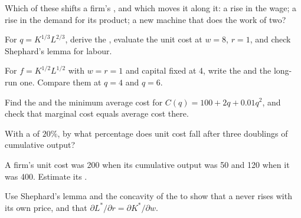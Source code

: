 \begin{exercise}[$\star$]\label{exo:b1:cost-minimisation:shift}
Which of these shifts a firm's , and which moves it along it:
a rise in the wage; a rise in the demand for its product; a new machine
that does the work of two?
\end{exercise}

\begin{exercise}[$\star\star$]\label{exo:b1:cost-minimisation:cd-cost}
For $q = K^{1/3}L^{2/3}$, derive the , evaluate the unit cost at
$w = 8$, $r = 1$, and check Shephard's lemma for labour.
\end{exercise}

\begin{exercise}[$\star\star$]\label{exo:b1:cost-minimisation:short}
For $f = K^{1/2}L^{1/2}$ with $w = r = 1$ and capital fixed at 4, write the
 and the long-run one. Compare them at $q = 4$ and
$q = 6$.
\end{exercise}

\begin{exercise}[$\star\star$]\label{exo:b1:cost-minimisation:mes-calc}
Find the  and the minimum average cost for
$C(q) = 100 + 2q + 0.01q^2$, and check that marginal cost equals average cost
there.
\end{exercise}

\begin{exercise}[$\star\star$]\label{exo:b1:cost-minimisation:three-doublings}
With a  of $20\%$, by what percentage does unit cost fall after
three doublings of cumulative output?
\end{exercise}

\begin{exercise}[$\star\star$]\label{exo:b1:cost-minimisation:estimate}
A firm's unit cost was 200 when its cumulative output was 50 and 120 when it
was 400. Estimate its .
\end{exercise}

\begin{exercise}[$\star\star\star$]\label{exo:b1:cost-minimisation:law}
Use Shephard's lemma and the concavity of the  to show that a
 never rises with its own price, and that
$\partial L^*/\partial r = \partial K^*/\partial w$.
\end{exercise}

